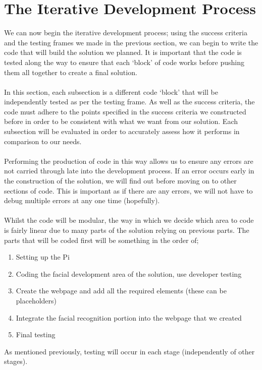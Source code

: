 \documentclass[9pt]{article}
\begin{document}
\newpage
\section{The Iterative Development Process}
We can now begin the iterative development process; using the success criteria and the testing frames we made in the previous section, we can begin to write the code that will build the solution we planned. It is important that the code is tested along the way to ensure that each `block' of code works before pushing them all together to create a final solution.\\\\
In this section, each subsection is a different code `block' that will be independently tested as per the testing frame. As well as the success criteria, the code must adhere to the points specified in the success criteria we constructed before in order to be consistent with what we want from our solution. Each subsection will be evaluated in order to accurately assess how it performs in comparison to our needs.\\\\
Performing the production of code in this way allows us to ensure any errors are not carried through late into the development process. If an error occurs early in the construction of the solution, we will find out before moving on to other sections of code. This is important as if there are any errors, we will not have to debug multiple errors at any one time (hopefully).\\\\
Whilst the code will be modular, the way in which we decide which area to code is fairly linear due to many parts of the solution relying on previous parts. The parts that will be coded first will be something in the order of;
\begin{enumerate}
	\item Setting up the Pi
	\item Coding the facial development area of the solution, use developer testing
	\item Create the webpage and add all the required elements (these can be placeholders)
	\item Integrate the facial recognition portion into the webpage that we created
	\item Final testing
\end{enumerate}
As mentioned previously, testing will occur in each stage (independently of other stages).\\\\
\end{document}
